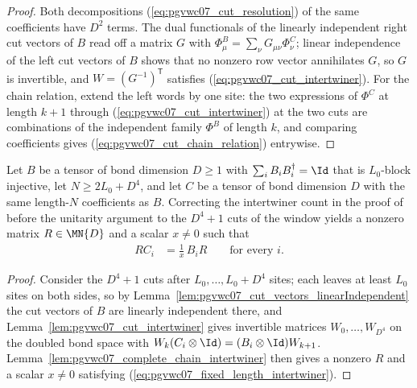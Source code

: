 \begin{proof}
    \leanok
    Both decompositions (\ref{eq:pgvwc07_cut_resolution}) of the same
    coefficients have $D^2$ terms. The dual functionals of the linearly
    independent right cut vectors of $B$ read off a matrix $G$ with
    $\Phi^{B}_{\mu}=\sum_\nu G_{\mu\nu}\Phi^{C}_{\nu}$; linear independence of
    the left cut vectors of $B$ shows that no nonzero row vector annihilates
    $G$, so $G$ is invertible, and $W=(G^{-1})^{\mathsf T}$ satisfies
    (\ref{eq:pgvwc07_cut_intertwiner}). For the chain relation, extend the
    left words by one site: the two expressions of $\Phi^{C}$ at length
    $k+1$ through (\ref{eq:pgvwc07_cut_intertwiner}) at the two cuts are
    combinations of the independent family $\Phi^{B}$ of length $k$, and
    comparing coefficients gives (\ref{eq:pgvwc07_cut_chain_relation})
    entrywise.
\end{proof}

\begin{lemma}
    \label{thm:pgvwc07_fixed_length_intertwiner}
    \leanok
    Let $B$ be a tensor of bond dimension $D\ge1$ with
    $\sum_iB_iB_i^\dagger=\Id$ that is $L_0$-block injective, let
    $N\ge2L_0+D^4$, and let $C$ be a tensor of bond dimension $D$ with the
    same length-$N$ coefficients as $B$. Correcting the intertwiner count in the proof of
    \cite[Theorem~7]{PerezGarcia2007Matrix} before the unitarity argument to the $D^4+1$ cuts of the window
    \cite{gap:pgvwc07_intertwiner_chain_off_by_one} yields a nonzero matrix
    $R\in\MN{D}$ and a scalar $x\neq0$ such that
    \begin{align}
        RC_i & =\tfrac1x\,B_iR \qquad\text{for every }i.
        \label{eq:pgvwc07_fixed_length_intertwiner}
    \end{align}
\end{lemma}

\begin{proof}
    \leanok
    Consider the $D^4+1$ cuts after $L_0,\ldots,L_0+D^4$ sites; each leaves
    at least $L_0$ sites on both sides, so by
    Lemma~\ref{lem:pgvwc07_cut_vectors_linearIndependent} the cut vectors of
    $B$ are linearly independent there, and
    Lemma~\ref{lem:pgvwc07_cut_intertwiner} gives invertible matrices
    $W_0,\ldots,W_{D^4}$ on the doubled bond space with
    $W_k(C_i\otimes\Id)=(B_i\otimes\Id)W_{k+1}$.
    Lemma~\ref{lem:pgvwc07_complete_chain_intertwiner} then gives a nonzero
    $R$ and a scalar $x\neq0$ satisfying
    (\ref{eq:pgvwc07_fixed_length_intertwiner}).
\end{proof}

